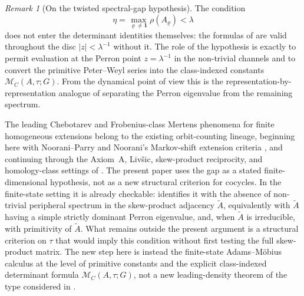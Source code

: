 \documentclass[11pt,a4paper]{amsart}
\theoremstyle{plain}
\theoremstyle{definition}
\theoremstyle{remark}
\newtheorem{remark}[theorem]{Remark}
\begin{document}
\begin{remark}[On the twisted spectral-gap hypothesis]
  \label{rem:twisted-spectral-gap-role}
  The condition
  \[
    \eta=\max_{\varrho\neq\mathbf 1}\rho(A_\varrho)<\lambda
  \]
  does not enter the determinant identities themselves: the formulas of
  are valid throughout the disc \(|z|<\lambda^{-1}\) without it. The
  role of the hypothesis is exactly to permit evaluation at the Perron
  point \(z=\lambda^{-1}\) in the non-trivial channels and to convert the
  primitive Peter--Weyl series into the class-indexed constants
  \(\mathcal M_C(A,\tau;G)\). From the dynamical point of view this is the
  representation-by-representation analogue of separating the Perron
  eigenvalue from the remaining spectrum.

  The leading Chebotarev and Frobenius-class Mertens phenomena for finite
  homogeneous extensions belong to the existing orbit-counting lineage,
  beginning here with Noorani--Parry
  \cite{NooraniParry1992ChebotarevShifts} and Noorani's Markov-shift
  extension criteria \cite{Noorani1997HomogeneousExtensionsMarkov}, and
  continuing through the Axiom~A, Liv\v{s}ic, skew-product reciprocity, and
  homology-class settings of
  \cite{ParryPollicott1986Chebotarev,Parry1999LivsicNonAbelian,ParryPollicott1997LivsicCompactLie,ParryPollicott2008BauerSkewProducts,PollicottSharp2008ArtinReciprocitySkewProducts,KatsudaSunada1990ClosedOrbitsHomology,Sharp1993ClosedOrbitsHomologyAnosov,PollicottSharp2007Chebotarev,BoyleSchmieding2017FiniteGroupExtensions}.
  The present paper uses the gap as a stated finite-dimensional hypothesis,
  not as a new structural criterion for cocycles.  In the finite-state setting
  it is already checkable:
   identifies it with the
  absence of non-trivial peripheral spectrum in the skew-product
  adjacency \(\widetilde A\), equivalently with \(\widetilde A\) having
  a simple strictly dominant Perron eigenvalue, and, when
  \(\widetilde A\) is irreducible, with primitivity of
  \(\widetilde A\). What remains outside the present argument is a structural
  criterion on \(\tau\) that would imply this condition without first testing
  the full skew-product matrix.  The new step here is instead the
  finite-state Adams--M\"obius calculus at the level of primitive constants
  and the explicit class-indexed determinant formula
  \(\mathcal M_C(A,\tau;G)\), not a new leading-density theorem of the type
  considered in
  \cite{Lalley1987DistributionPeriodicOrbits,Coles2025VassilievWritheAxiomA}.
\end{remark}
\end{document}

